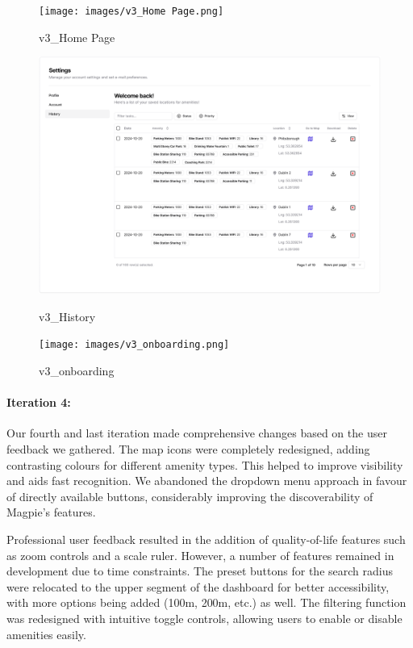 \begin{figure}[htbp]
    \centering
    \begin{minipage}{0.32\textwidth}
        \centering
        \texttt{[image: images/v3\_Home Page.png]}
        \caption{v3\_Home Page}
        \label{fig:v3_Home Page}
    \end{minipage}
    \hfill
    \begin{minipage}{0.32\textwidth}
        \centering
        \includegraphics[width=\textwidth]{images/v3_History.png}
        \caption{v3\_History}
        \label{fig:v3_History}
    \end{minipage}
    \hfill
    \begin{minipage}{0.32\textwidth}
        \centering
        \texttt{[image: images/v3\_onboarding.png]}
        \caption{v3\_onboarding}
        \label{fig:v3_onboarding}
    \end{minipage}

\end{figure}

\paragraph{Iteration 4:}
Our fourth and last iteration made comprehensive changes based on the user 
feedback we gathered. The map icons were completely redesigned, adding contrasting 
colours for different amenity types. This helped to improve visibility and aids fast 
recognition. We abandoned the dropdown menu approach in favour of directly available
buttons, considerably improving the discoverability of Magpie's features.

Professional user feedback resulted in the addition of quality-of-life features
such as zoom controls and a scale ruler. However, a number of features remained in 
development due to time constraints. The preset buttons for the search radius were 
relocated to the upper segment of the dashboard for better accessibility, with more 
options being added (100m, 200m, etc.) as well. The filtering function was redesigned 
with intuitive toggle controls, allowing users to enable or disable amenities easily.

